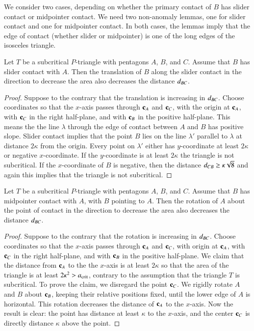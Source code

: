 We consider two cases, depending on whether the primary contact of $B$
has slider contact or midpointer contact.  We need two non-anomaly
lemmas, one for slider contact and one for midpointer contact.  In
both cases, the lemmas imply that the edge of contact (whether slider
or midpointer) is one of the long edges of the isosceles triangle.

\begin{lemma}  
  Let $T$ be a subcritical $P$-triangle with pentagons $A$, $B$, and
  $C$.  Assume that $B$ has slider contact with $A$.  Then the
  translation of $B$ along the slider contact in the direction to
  decrease the area also decreases the distance $d_{BC}$.
\end{lemma}

\begin{proof} 
  Suppose to the contrary that the translation is increasing in
  $d_{BC}$.  Choose coordinates so that the $x$-axis passes through
  ${\mathbf c}_A$ and ${\mathbf c}_C$, with the origin at ${\mathbf c}_A$, with ${\mathbf c}_C$ in the
  right half-plane, and with ${\mathbf c}_B$ in the positive half-plane.  This
  means the the line $\lambda$ through the edge of contact between $A$
  and $B$ has positive slope.  Slider contact implies that the point
  $B$ lies on the line $\lambda'$ parallel to $\lambda$ at distance
  $2\kappa$ from the origin.  Every point on $\lambda'$ either has
  $y$-coordinate at least $2\kappa$ or negative $x$-coordinate.  If
  the $y$-coordinate is at least $2\kappa$ the triangle is not
  subcritical.  If the $x$-coordinate of $B$ is negative, then the
  distance $d_{CB} \ge\kappa\sqrt8$ and again this implies that the
  triangle is not subcritical.
\end{proof}

\begin{lemma}  
  Let $T$ be a subcritical $P$-triangle with pentagons $A$, $B$, and
  $C$.  Assume that $B$ has midpointer contact with $A$, with $B$
  pointing to $A$.  Then the rotation of $A$ about the point of
  contact in the direction to decrease the area also decreases the
  distance $d_{BC}$.
\end{lemma}

\begin{proof} 
  Suppose to the contrary that the rotation is increasing in
  $d_{BC}$.  Choose coordinates so that the $x$-axis passes through
  ${\mathbf c}_A$ and ${\mathbf c}_C$, with origin at ${\mathbf c}_A$, with ${\mathbf c}_C$ in the right
  half-plane, and with ${\mathbf c}_B$ in the positive half-plane.  We claim
  that the distance from ${\mathbf c}_A$ to the the $x$-axis is at least
  $2\kappa$ so that the area of the triangle is at least $2\kappa^2 >
  a_\text{crit}$, contrary to the assumption that the triangle $T$ is
  subcritical.  To prove the claim, we disregard the point ${\mathbf c}_C$.  We
  rigidly rotate $A$ and $B$ about ${\mathbf c}_B$, keeping their relative
  positions fixed, until the lower edge of $A$ is horizontal.  This
  rotation decreases the distance of ${\mathbf c}_A$ to the $x$-axis.  Now the
  result is clear: the point has distance at least $\kappa$ to the
  $x$-axis, and the center ${\mathbf c}_C$ is directly distance $\kappa$ above
  the point.
\end{proof}

